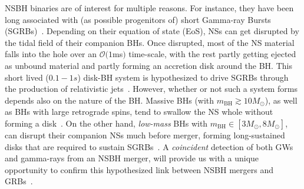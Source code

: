 \documentclass[aps,prd,amsmath,floats,floatfix, twocolumn,
superscriptaddress,nofootinbib,showpacs]{revtex4-1}
\newcommand{\mbh}{m_\mathrm{BH}}
\begin{document}
NSBH binaries are of interest for multiple reasons. For instance,
they have been long associated with (as possible progenitors of) short
Gamma-ray Bursts (SGRBs)~\cite{eichler:89,1992ApJ...395L..83N,moch:93,Barthelmy:2005bx,
2005Natur.437..845F,2005Natur.437..851G,Shibata:2005mz,Paschalidis2014,
Tanvir:2013}. Depending on their equation of state (EoS), NSs can get disrupted by
the tidal field of their companion BHs. Once disrupted, most of the NS
material falls into the hole over an $\mathcal{O}(1$ms$)$ time-scale,
with the rest partly getting ejected as unbound material
and partly forming an accretion disk around the BH.
% 
This short lived ($0.1-1s$) disk-BH system is hypothesized to drive SGRBs
through the production of relativistic jets~\cite{Foucart:2015a,
Lovelace:2013vma,Deaton2013,Foucart2012,Shibata:2005mz,Paschalidis2014}.
% 
However, whether or not such a system forms depends also on the nature of
the BH. Massive BHs (with $\mbh\gtrsim 10M_\odot$), as well as BHs with
large retrograde spins, tend to swallow the NS whole without forming a
disk~\cite{Foucart:2013psa}. 
% 
On the other hand, {\it low-mass} BHs with $\mbh\in[3M_\odot, 8M_\odot]$, 
can disrupt their companion NSs much before merger, forming long-sustained disks
that are required to sustain 
SGRBs~\cite{Shibata:2007zm,2010PhRvD..81f4026F,Lovelace:2013vma,Kawaguchi:2015}.
% 
A {\it coincident} detection of both GWs and gamma-rays from an NSBH merger,
will
provide us with a unique opportunity to confirm this hypothesized link between
NSBH mergers and GRBs~\cite{Abbott:2016wya}.
\end{document}
